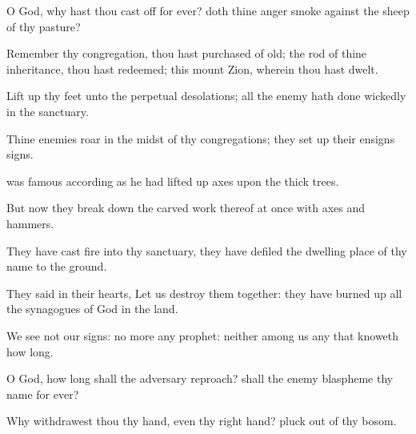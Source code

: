{\Q {}O
God, why hast thou cast
{}
off for
ever?
{} doth thine
anger
smoke against the
sheep of thy
pasture?


\par }{\Q {}Remember thy
congregation,
{} thou hast
purchased of
old; the
rod of thine
inheritance,
{} thou hast
redeemed; this
mount
Zion, wherein thou hast
dwelt.


\par }{\Q {}Lift
up thy
feet unto the
perpetual
desolations;
{} all
{} the
enemy hath done
wickedly in the
sanctuary.


\par }{\Q {}Thine
enemies
roar in the
midst of thy
congregations; they set
up their
ensigns
{}
signs.


\par }{\Q {} was
famous according as he had lifted
up
axes upon the
thick
trees.


\par }{\Q {}But now they break
down the carved
work thereof at
once with
axes and
hammers.


\par }{\Q {}They have
cast
fire into thy
sanctuary, they have
defiled
{} the dwelling
place of thy
name to the
ground.


\par }{\Q {}They
said in their
hearts, Let us
destroy them
together: they have burned
up all the
synagogues of
God in the
land.


\par }{\Q {}We
see not our
signs:
{} no more any
prophet: neither
{} among us any that
knoweth how
long.


\par }{\Q {}O
God, how long shall the
adversary
reproach? shall the
enemy
blaspheme thy
name for
ever?


\par }{\Q {}Why
withdrawest thou thy
hand, even thy right
hand?
pluck
{} out
of thy
bosom.


\par }{\BB \par }
